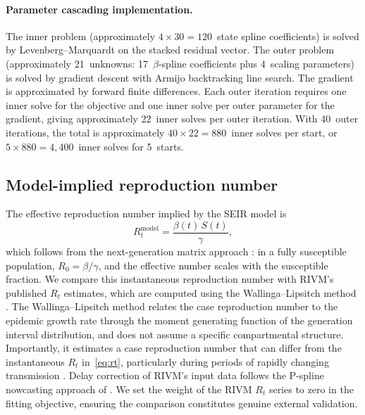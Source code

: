 \documentclass[11pt]{article}
\begin{document}
\paragraph{Parameter cascading implementation.}
The inner problem (approximately $4 \times 30 = 120$~state spline coefficients) is solved by Levenberg--Marquardt on the stacked residual vector. The outer problem (approximately 21~unknowns: 17~$\beta$-spline coefficients plus 4~scaling parameters) is solved by gradient descent with Armijo backtracking line search. The gradient is approximated by forward finite differences. Each outer iteration requires one inner solve for the objective and one inner solve per outer parameter for the gradient, giving approximately 22~inner solves per outer iteration. With 40~outer iterations, the total is approximately $40 \times 22 = 880$~inner solves per start, or $5 \times 880 = 4{,}400$~inner solves for 5~starts.

\subsection{Model-implied reproduction number}\label{sec:rt-method}

The effective reproduction number implied by the SEIR model is
\begin{equation}\label{eq:rt}
  R_t^{\mathrm{model}} = \frac{\beta(t)\,S(t)}{\gamma},
\end{equation}
which follows from the next-generation matrix approach \citep{Keeling2008}: in a fully susceptible population, $R_0 = \beta/\gamma$, and the effective number scales with the susceptible fraction. We compare this instantaneous reproduction number with RIVM's published $R_t$ estimates, which are computed using the Wallinga--Lipsitch method \citep{WallingaLipsitch2007}. The Wallinga--Lipsitch method relates the case reproduction number to the epidemic growth rate through the moment generating function of the generation interval distribution, and does not assume a specific compartmental structure. Importantly, it estimates a case reproduction number that can differ from the instantaneous $R_t$ in~\eqref{eq:rt}, particularly during periods of rapidly changing transmission \citep{Gostic2020,Vegvari2022}. Delay correction of RIVM's input data follows the P-spline nowcasting approach of \citet{vandeKassteele2019}. We set the weight of the RIVM $R_t$ series to zero in the fitting objective, ensuring the comparison constitutes genuine external validation.

\end{document}
